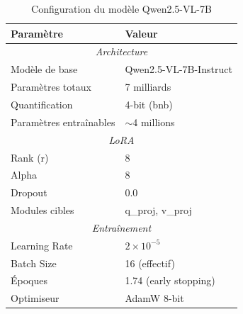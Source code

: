 
\begin{table}[h]
\centering
\caption{Configuration du modèle Qwen2.5-VL-7B}
\label{tab:config_qwen}
\begin{tabular}{ll}
\hline
\textbf{Paramètre} & \textbf{Valeur} \\
\hline
\multicolumn{2}{c}{\textit{Architecture}} \\
\hline
Modèle de base & Qwen2.5-VL-7B-Instruct \\
Paramètres totaux & 7 milliards \\
Quantification & 4-bit (bnb) \\
Paramètres entraînables & $\sim$4 millions \\
\hline
\multicolumn{2}{c}{\textit{LoRA}} \\
\hline
Rank (r) & 8 \\
Alpha & 8 \\
Dropout & 0.0 \\
Modules cibles & q\_proj, v\_proj \\
\hline
\multicolumn{2}{c}{\textit{Entraînement}} \\
\hline
Learning Rate & $2 \times 10^{-5}$ \\
Batch Size & 16 (effectif) \\
Époques & 1.74 (early stopping) \\
Optimiseur & AdamW 8-bit \\
\hline
\end{tabular}
\end{table}

